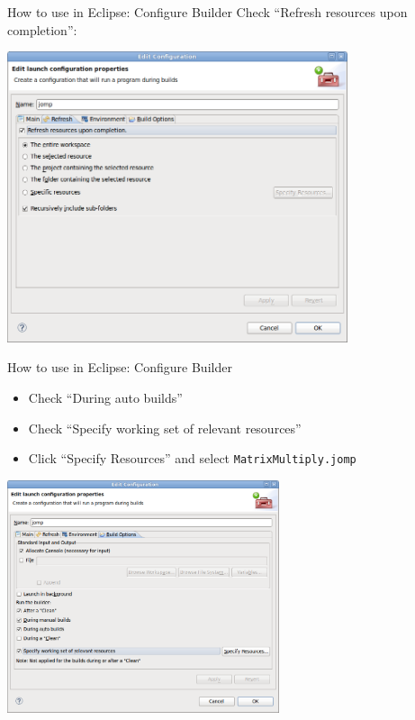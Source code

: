 \begin{frame}{How to use in Eclipse: Configure Builder}
  Check ``Refresh resources upon completion'':


  \begin{center}
    \includegraphics[width=0.75\textwidth]{figures/jomp-builder3}
  \end{center}
\end{frame}

\begin{frame}{How to use in Eclipse: Configure Builder}
  \begin{itemize}
  \item Check ``During auto builds''
  \item Check ``Specify working set of relevant resources''
  \item Click ``Specify Resources'' and select
    \lstinline!MatrixMultiply.jomp!
  \end{itemize}


  \begin{center}
    \includegraphics[width=0.6\textwidth]{figures/jomp-builder4}
  \end{center}
\end{frame}


